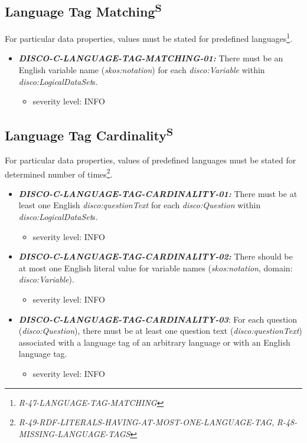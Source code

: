 \documentclass{llncs}
\begin{document}
\subsection{Language Tag Matching\textsuperscript{S}}

For particular data properties, values must be stated for predefined languages\footnote{{\em R-47-LANGUAGE-TAG-MATCHING}}.

\begin{itemize}
	\item \textbf{{\em DISCO-C-LANGUAGE-TAG-MATCHING-01:}}
There must be an English variable name ({\em skos:notation}) for each {\em disco:Variable} within {\em disco:LogicalDataSet}s.
\begin{itemize}
	\item severity level: INFO
\end{itemize}
\end{itemize}

\subsection{Language Tag Cardinality\textsuperscript{S}}

For particular data properties, values of predefined languages must be stated for determined number of times\footnote{{\em R-49-RDF-LITERALS-HAVING-AT-MOST-ONE-LANGUAGE-TAG}, {\em R-48-MISSING-LANGUAGE-TAGS}}.

\begin{itemize}

	\item \textbf{{\em DISCO-C-LANGUAGE-TAG-CARDINALITY-01:}}
  There must be at least one English {\em disco:questionText} for each {\em disco:Question} within {\em disco:LogicalDataSet}s.
\begin{itemize}
	\item severity level: INFO
\end{itemize}
  \item \textbf{{\em DISCO-C-LANGUAGE-TAG-CARDINALITY-02:}}
  There should be at most one English literal value for variable names ({\em skos:notation}, domain: {\em disco:Variable}).
\begin{itemize}
	\item severity level: INFO
\end{itemize}
  \item \textbf{{\em DISCO-C-LANGUAGE-TAG-CARDINALITY-03}}:
	For each question (\emph{disco:Question}), there must be at least one question text (\emph{disco:questionText}) associated with a language tag of an arbitrary language or with an English language tag.
\begin{itemize}
	\item severity level: INFO
\end{itemize}
\end{itemize}
\end{document}
